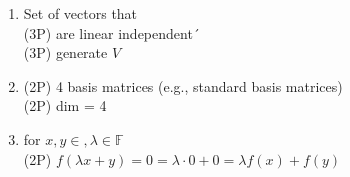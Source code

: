 {\color{solution}
\begin{enumerate}
	\item Set of vectors that\\
	\textcolor{exampoints}{(3P)} are linear independent´\\
	 \textcolor{exampoints}{(3P)} generate $V$
	\item  \textcolor{exampoints}{(2P)} 4 basis matrices (e.g., standard basis matrices)\\
	\textcolor{exampoints}{(2P)} dim = 4
	\item for $x,y\in,\lambda\in\mathbb{F}$ \\
	\textcolor{exampoints}{(2P)} $  f(\lambda x + y) = 0 = \lambda \cdot 0 + 0 = \lambda f( x) + f(y)$
\end{enumerate}
}
